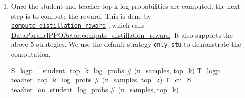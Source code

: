 \begin{enumerate}
\begin{codeblock}[language=Python]
    # ... omitted for brevity ...
    
    chunk_log_probs = torch.gather(
        logits_chunk, dim=-1, index=student_ids_chunk) - t_logsumexp
    

    \end{codeblock}
    The gathered values are returned as \texttt{teacher\_on\_student\_log\_probs}, so for
    \texttt{only\_stu},
    \[
        \texttt{teacher\_on\_student\_log\_probs}[i]
        =
        \log \pi_{\mathrm{Teacher}}(i\mid x,y_{<t}) \equiv \log q_t(i)
        \qquad i\in S_t,
    \]
    with the teacher logits divided by \texttt{teacher\_temperature}.

    \item Once the student and teacher top-k log-probabilities are computed, the next step is to compute the reward. This is done by \href{https://github.com/Thinking-Space/Rethinking-OPD/blob/ac26e38d6f1572eb027597b48a9f4e01f6915ef8/verl/verl/trainer/ppo/ray_trainer.py#L1143}{\texttt{compute\_distillation\_reward}} 
    \newline
    , which calls
    \href{https://github.com/Thinking-Space/Rethinking-OPD/blob/ac26e38d6f1572eb027597b48a9f4e01f6915ef8/verl/verl/workers/actor/dp_actor.py#L451}{DataParallelPPOActor.compute\_distillation\_reward}. It also supports the above 5 strategies. We use the default strategy \texttt{only\_stu} to demonstrate the computation.
    \begin{codeblock}[language=Python]
S_logp = student_top_k_log_probs # (n_samples, top_k)
T_logp = teacher_top_k_log_probs # (n_samples, top_k)
T_on_S = teacher_on_student_log_probs # (n_samples, top_k)


\end{codeblock}
\end{enumerate}
